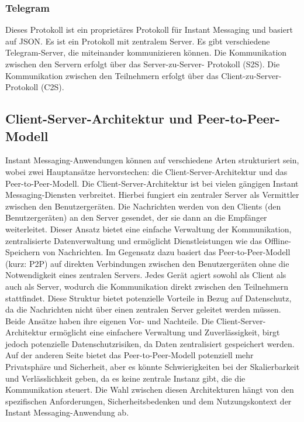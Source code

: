 \subsubsection{Telegram}
Dieses Protokoll ist ein proprietäres Protokoll für Instant Messaging und basiert auf JSON. Es ist
ein Protokoll mit zentralem Server. Es gibt verschiedene Telegram-Server, die miteinander
kommunizieren können. Die Kommunikation zwischen den Servern erfolgt über das Server-zu-Server-
Protokoll (S2S). Die Kommunikation zwischen den Teilnehmern erfolgt über das Client-zu-Server-
Protokoll (C2S).


\subsection{Client-Server-Architektur und Peer-to-Peer-Modell}

Instant Messaging-Anwendungen können auf verschiedene Arten strukturiert sein, wobei zwei Hauptansätze hervorstechen: die Client-Server-Architektur und das Peer-to-Peer-Modell.
Die Client-Server-Architektur ist bei vielen gängigen Instant Messaging-Diensten verbreitet. Hierbei fungiert ein zentraler Server als Vermittler zwischen den Benutzergeräten. Die Nachrichten werden von den Clients (den Benutzergeräten) an den Server gesendet, der sie dann an die Empfänger weiterleitet. Dieser Ansatz bietet eine einfache Verwaltung der Kommunikation, zentralisierte Datenverwaltung und ermöglicht Dienstleistungen wie das Offline-Speichern von Nachrichten.
Im Gegensatz dazu basiert das Peer-to-Peer-Modell (kurz: P2P) auf direkten Verbindungen zwischen den Benutzergeräten ohne die Notwendigkeit eines zentralen Servers. Jedes Gerät agiert sowohl als Client als auch als Server, wodurch die Kommunikation direkt zwischen den Teilnehmern stattfindet. Diese Struktur bietet potenzielle Vorteile in Bezug auf Datenschutz, da die Nachrichten nicht über einen zentralen Server geleitet werden müssen.
Beide Ansätze haben ihre eigenen Vor- und Nachteile. Die Client-Server-Architektur ermöglicht eine einfachere Verwaltung und Zuverlässigkeit, birgt jedoch potenzielle Datenschutzrisiken, da Daten zentralisiert gespeichert werden. Auf der anderen Seite bietet das Peer-to-Peer-Modell potenziell mehr Privatsphäre und Sicherheit, aber es könnte Schwierigkeiten bei der Skalierbarkeit und Verlässlichkeit geben, da es keine zentrale Instanz gibt, die die Kommunikation steuert. Die Wahl zwischen diesen Architekturen hängt von den spezifischen Anforderungen, Sicherheitsbedenken und dem Nutzungskontext der Instant Messaging-Anwendung ab.
